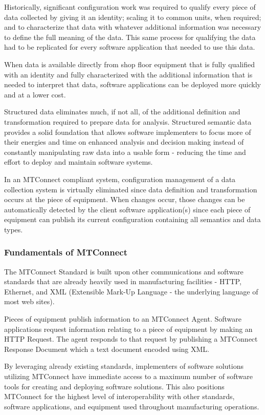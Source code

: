 Historically, significant configuration work was required to qualify every piece of data collected by giving it an identity; scaling it to common units, when required; and to characterize that data with whatever additional information was necessary to define the full meaning of the data.   This same process for qualifying the data had to be replicated for every software application that needed to use this data.    

When data is available directly from shop floor equipment that is fully qualified with an identity and fully characterized with the additional information that is needed to interpret that data, software applications can be deployed more quickly and at a lower cost.    

Structured data eliminates much, if not all, of the additional definition and transformation required to prepare data for analysis.   Structured semantic data provides a solid foundation that allows software implementers to focus more of their energies and time on enhanced analysis and decision making instead of constantly manipulating raw data into a usable form - reducing the time and effort to deploy and maintain software systems.  
 
In an MTConnect compliant system, configuration management of a data collection system is virtually eliminated since data definition and transformation occurs at the piece of equipment.   When changes occur, those changes can be automatically detected by the client software application(s) since each piece of equipment can publish its current configuration containing all semantics and data types.

\subsubsection{Fundamentals of MTConnect}

The MTConnect Standard is built upon other communications and software standards that are already heavily used in manufacturing facilities - HTTP, Ethernet, and XML (Extensible Mark-Up Language - the underlying language of most web sites).
 
Pieces of equipment publish information to an MTConnect Agent.  Software applications request information relating to a piece of equipment by making an HTTP Request. The agent responds to that request by publishing a MTConnect Response Document which a text document encoded using XML.   
 
By leveraging already existing standards, implementers of software solutions utilizing MTConnect have immediate access to a maximum number of software tools for creating and deploying software solutions.   This also positions MTConnect for the highest level of interoperability with other standards, software applications, and equipment used throughout manufacturing operations.    
 
